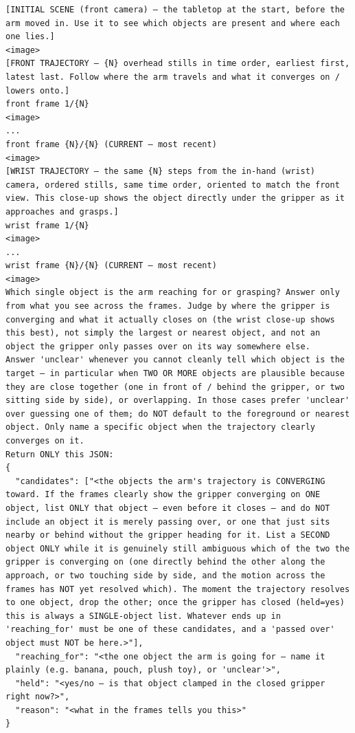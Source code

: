 \begin{lstlisting}[style=prompt]
[INITIAL SCENE (front camera) — the tabletop at the start, before the arm moved in. Use it to see which objects are present and where each one lies.]
<image>
[FRONT TRAJECTORY — {N} overhead stills in time order, earliest first, latest last. Follow where the arm travels and what it converges on / lowers onto.]
front frame 1/{N}
<image>
...
front frame {N}/{N} (CURRENT — most recent)
<image>
[WRIST TRAJECTORY — the same {N} steps from the in-hand (wrist) camera, ordered stills, same time order, oriented to match the front view. This close-up shows the object directly under the gripper as it approaches and grasps.]
wrist frame 1/{N}
<image>
...
wrist frame {N}/{N} (CURRENT — most recent)
<image>
Which single object is the arm reaching for or grasping? Answer only from what you see across the frames. Judge by where the gripper is converging and what it actually closes on (the wrist close-up shows this best), not simply the largest or nearest object, and not an object the gripper only passes over on its way somewhere else.
Answer 'unclear' whenever you cannot cleanly tell which object is the target — in particular when TWO OR MORE objects are plausible because they are close together (one in front of / behind the gripper, or two sitting side by side), or overlapping. In those cases prefer 'unclear' over guessing one of them; do NOT default to the foreground or nearest object. Only name a specific object when the trajectory clearly converges on it.
Return ONLY this JSON:
{
  "candidates": ["<the objects the arm's trajectory is CONVERGING toward. If the frames clearly show the gripper converging on ONE object, list ONLY that object — even before it closes — and do NOT include an object it is merely passing over, or one that just sits nearby or behind without the gripper heading for it. List a SECOND object ONLY while it is genuinely still ambiguous which of the two the gripper is converging on (one directly behind the other along the approach, or two touching side by side, and the motion across the frames has NOT yet resolved which). The moment the trajectory resolves to one object, drop the other; once the gripper has closed (held=yes) this is always a SINGLE-object list. Whatever ends up in 'reaching_for' must be one of these candidates, and a 'passed over' object must NOT be here.>"],
  "reaching_for": "<the one object the arm is going for — name it plainly (e.g. banana, pouch, plush toy), or 'unclear'>",
  "held": "<yes/no — is that object clamped in the closed gripper right now?>",
  "reason": "<what in the frames tells you this>"
}
\end{lstlisting}
